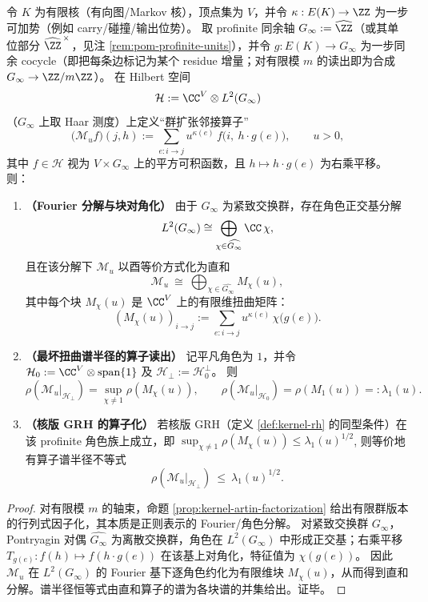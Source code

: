 \begin{proposition}\label{prop:pom-profinite-artin-hilbert}
令 \(K\) 为有限核（有向图/Markov 核），顶点集为 \(V\)，并令 \(\kappa:E(K)\to\ZZ\) 为一步可加势（例如 carry/碰撞/输出位势）。
取 profinite 同余轴 \(G_\infty:=\widehat{\ZZ}\)（或其单位部分 \(\widehat{\ZZ}^{\,\times}\)，见注 \ref{rem:pom-profinite-units}），并令
\(
g:E(K)\to G_\infty
\)
为一步同余 cocycle（即把每条边标记为某个 residue 增量；对有限模 \(m\) 的读出即为合成 \(G_\infty\to\ZZ/m\ZZ\)）。
在 Hilbert 空间
\[
\mathcal{H}:=\CC^{V}\otimes L^2(G_\infty)
\]
（\(G_\infty\) 上取 Haar 测度）上定义“群扩张邻接算子”
\[
\bigl(\mathcal{M}_u f\bigr)(j,h)
:=\sum_{e:i\to j} u^{\kappa(e)}\, f\!\bigl(i,\ h\cdot g(e)\bigr),
\qquad u>0,
\]
其中 \(f\in\mathcal{H}\) 视为 \(V\times G_\infty\) 上的平方可积函数，且 \(h\mapsto h\cdot g(e)\) 为右乘平移。
则：
\begin{enumerate}
  \item \textbf{（Fourier 分解与块对角化）} 由于 \(G_\infty\) 为紧致交换群，存在角色正交基分解
  \[
  L^2(G_\infty)\cong \bigoplus_{\chi\in\widehat{G_\infty}}\CC\,\chi,
  \]
  且在该分解下 \(\mathcal{M}_u\) 以酉等价方式化为直和
  \[
  \mathcal{M}_u\ \cong\ \bigoplus_{\chi\in\widehat{G_\infty}} M_\chi(u),
  \]
  其中每个块 \(M_\chi(u)\) 是 \(\CC^{V}\) 上的有限维扭曲矩阵：
  \[
  (M_\chi(u))_{i\to j}:=\sum_{e:i\to j} u^{\kappa(e)}\,\chi\!\bigl(g(e)\bigr).
  \]
  \item \textbf{（最坏扭曲谱半径的算子读出）} 记平凡角色为 \(1\)，并令
  \(
  \mathcal{H}_0:=\CC^V\otimes\mathrm{span}\{1\}
  \)
  及 \(\mathcal{H}_\perp:=\mathcal{H}_0^\perp\)。
  则
  \[
  \rho\!\left(\mathcal{M}_u|_{\mathcal{H}_\perp}\right)
  =\sup_{\chi\neq 1}\rho\!\left(M_\chi(u)\right),
  \qquad
  \rho\!\left(\mathcal{M}_u|_{\mathcal{H}_0}\right)=\rho\!\left(M_1(u)\right)=:\lambda_1(u).
  \]
  \item \textbf{（核版 GRH 的算子化）} 若核版 GRH（定义 \ref{def:kernel-rh} 的同型条件）在该 profinite 角色族上成立，即
  \(
  \sup_{\chi\neq 1}\rho(M_\chi(u))\le \lambda_1(u)^{1/2}
  \),
  则等价地有算子谱半径不等式
  \[
  \rho\!\left(\mathcal{M}_u|_{\mathcal{H}_\perp}\right)\ \le\ \lambda_1(u)^{1/2}.
  \]
\end{enumerate}
\end{proposition}
\begin{proof}
对有限模 \(m\) 的轴束，命题 \ref{prop:kernel-artin-factorization} 给出有限群版本的行列式因子化，其本质是正则表示的 Fourier/角色分解。
对紧致交换群 \(G_\infty\)，Pontryagin 对偶 \(\widehat{G_\infty}\) 为离散交换群，角色在 \(L^2(G_\infty)\) 中形成正交基；右乘平移 \(T_{g(e)}:f(h)\mapsto f(h\cdot g(e))\) 在该基上对角化，特征值为 \(\chi(g(e))\)。
因此 \(\mathcal{M}_u\) 在 \(L^2(G_\infty)\) 的 Fourier 基下逐角色约化为有限维块 \(M_\chi(u)\)，从而得到直和分解。谱半径恒等式由直和算子的谱为各块谱的并集给出。证毕。
\end{proof}

